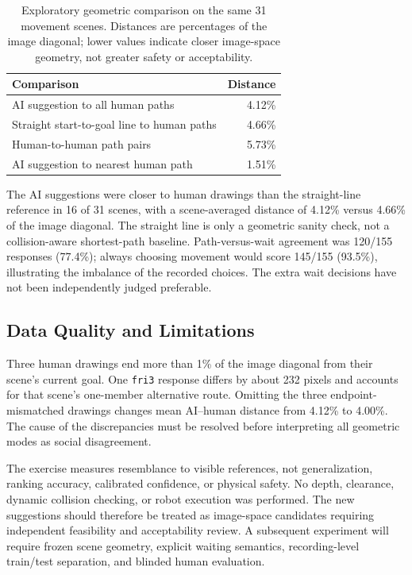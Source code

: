 \begin{table}[t]
\caption{Exploratory geometric comparison on the same 31 movement scenes.
Distances are percentages of the image diagonal; lower values indicate
closer image-space geometry, not greater safety or acceptability.}
\label{tab:reference_conditioned_pilot}
\centering
\begin{tabular}{@{}p{}r@{}}
\toprule
\textbf{Comparison} & \textbf{Distance} \\
\midrule
AI suggestion to all human paths & 4.12\% \\
Straight start-to-goal line to human paths & 4.66\% \\
Human-to-human path pairs & 5.73\% \\
AI suggestion to nearest human path & 1.51\% \\
\bottomrule
\end{tabular}
\end{table}

The AI suggestions were closer to human drawings than the straight-line
reference in 16 of 31 scenes, with a scene-averaged distance of 4.12\%
versus 4.66\% of the image diagonal. The straight line is only a geometric
sanity check, not a collision-aware shortest-path baseline. Path-versus-wait
agreement was 120/155 responses (77.4\%); always choosing movement would
score 145/155 (93.5\%), illustrating the imbalance of the recorded choices.
The extra wait decisions have not been independently judged preferable.

\subsection{Data Quality and Limitations}
Three human drawings end more than 1\% of the image diagonal from their
scene's current goal. One \texttt{fri3} response differs by about 232 pixels
and accounts for that scene's one-member alternative route. Omitting the
three endpoint-mismatched drawings changes mean AI--human distance from
4.12\% to 4.00\%. The cause of the discrepancies must be resolved before
interpreting all geometric modes as social disagreement.

The exercise measures resemblance to visible references, not generalization,
ranking accuracy, calibrated confidence, or physical safety. No depth,
clearance, dynamic collision checking, or robot execution was performed.
The new suggestions should therefore be treated as image-space candidates
requiring independent feasibility and acceptability review. A subsequent
experiment will require frozen scene geometry, explicit waiting semantics,
recording-level train/test separation, and blinded human evaluation.
